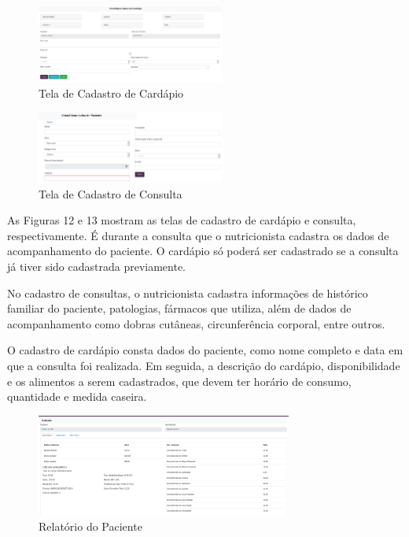 \documentclass[
	12pt,				%
    oneside,			%
	a4paper,			%
	english,			%
	french,				%
	spanish,			%
	brazil,				%
	]{abntex2}
\begin{document}
\begin{figure} [hbt]
\begin{center}
\includegraphics[width=0.55\textwidth]{cadastroCard.png}
\end{center}
\label{cadastroCard} 
\caption{Tela de Cadastro de Cardápio}
\end{figure}

\begin{figure} [hbt]
\begin{center}
\includegraphics[width=0.55\textwidth]{cadastroCons1.png}
\end{center}
\label{cadastroCons} 
\caption{Tela de Cadastro de Consulta}
\end{figure}

As Figuras 12 e 13 mostram as telas de cadastro de cardápio e consulta,
respectivamente. É durante a consulta que o nutricionista cadastra os dados de
acompanhamento do paciente. O cardápio só poderá ser cadastrado se a consulta já
tiver sido cadastrada previamente.

No cadastro de consultas, o nutricionista cadastra informações de histórico
familiar do paciente, patologias, fármacos que utiliza, além de dados de
acompanhamento como dobras cutâneas, circunferência corporal, entre outros.

O cadastro de cardápio consta dados do paciente, como nome completo e data
em que a consulta foi realizada. Em seguida, a descrição do cardápio, disponibilidade
e os alimentos a serem cadastrados, que devem ter horário de consumo, quantidade
e medida caseira.

\begin{figure} [hbt]
\label{relatPac} 
\caption{Relatório do Paciente}
\begin{center}
\includegraphics[width=0.75\textwidth]{relatPac1.png}
\end{center}
\end{figure}
\end{document}
